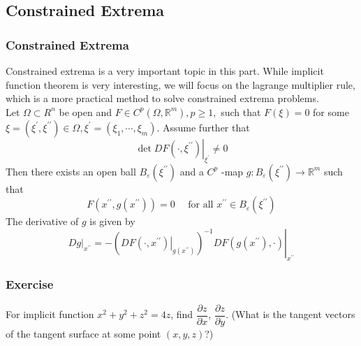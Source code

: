 \documentclass[10pt, t, allowdisplaybreaks]{beamer}
\newcommand{\nullspace}{~\\[15pt]}
\begin{document}
\subsection{Constrained Extrema}
\begin{frame}
    \frametitle{Constrained Extrema}
    Constrained extrema is a very important topic in this part. While implicit function theorem is very interesting, we will focus on the lagrange multiplier rule, which is a more practical method to solve constrained extrema problems.
    \nullspace
    Let $\Omega \subset R^{n}$ be open and $F \in C^{p}\left(\Omega, \mathbb{R}^{m}\right), p \geq 1,$ such that $F(\xi)=0$ for some $\xi=\left(\xi^{\prime}, \xi^{\prime \prime}\right) \in \Omega, \xi^{\prime}=\left(\xi_{1}, \cdots, \xi_{m}\right) .$ Assume further that
    \[
        \left.\operatorname{det} D F\left(\cdot, \xi^{\prime \prime}\right)\right|_{\xi^{\prime}} \neq 0
    \]
    Then there exists an open ball $B_{\varepsilon}\left(\xi^{\prime \prime}\right)$ and a $C^{p}$ -map $g: B_{\varepsilon}\left(\xi^{\prime \prime}\right) \rightarrow \mathbb{R}^{m}$
    such that
    \[
        F\left(x^{\prime \prime}, g\left(x^{\prime \prime}\right)\right)=0 \quad \text { for all } x^{\prime \prime} \in B_{\varepsilon}\left(\xi^{\prime \prime}\right)
    \]
    The derivative of $g$ is given by
    \[
        \left.D g\right|_{x^{\prime \prime}}=-\left.\left(\left.D F\left(\cdot, x^{\prime \prime}\right)\right|_{g\left(x^{\prime \prime}\right)}\right)^{-1} D F\left(g\left(x^{\prime \prime}\right), \cdot\right)\right|_{x^{\prime \prime}}
    \]
\end{frame}

\begin{frame}
    \frametitle{Exercise}

    For implicit function $x^2+y^2+z^2=4z$, find $\dfrac{\partial z}{\partial x}$, $\dfrac{\partial z}{\partial y}$. (What is the tangent vectors of the tangent surface at some point $(x,y,z)$?)

\end{frame}
\end{document}
